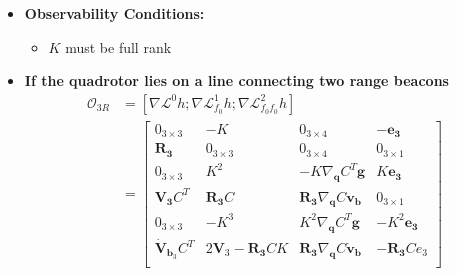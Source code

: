 \documentclass[]{article}
\begin{document}
\begin{itemize}
	\item \textbf{Observability Conditions:}
	\begin{itemize}
		\item $K$ must be full rank
	\end{itemize}
	\pagebreak
	\item \textbf{If the quadrotor lies on a line connecting two range beacons}
	\begin{align*}
	\mathcal{O}_{3R} &= [\nabla\mathcal{L}^0h;\nabla\mathcal{L}^1_{f_0}h;\nabla\mathcal{L}^2_{f_0f_0}h]\\ 
	&= \begin{bmatrix}
	0_{3\times 3}& -K& 0_{3\times 4}& -\bm{e_3}\\
	\bm{R_3} & 0_{3\times 3} & 0_{3\times 4} & 0_{3\times 1}\\
	0_{3\times 3}& K^2& -K\nabla_{\bm{q}} C^T\bm{g}& K\bm{e_3}\\
	\bm{V_3} C^T & \bm{R_3}C & \bm{R_3}\nabla_{\bm{q}} C\bm{v_b} & 0_{3\times 1}\\
	0_{3\times 3}& -K^3& K^2\nabla_{\bm{q}} C^T\bm{g}& -K^2\bm{e_3}\\
	\bm{\dot{V}}_{\bm{b}_3} C^T & 2\bm{V}_3 - \bm{R_3}CK & \bm{R_3}\nabla_{\bm{q}} C\bm{\dot{v}_b} & -\bm{R_3}Ce_3\\

\end{bmatrix}
\end{align*}
\end{itemize}
\end{document}
